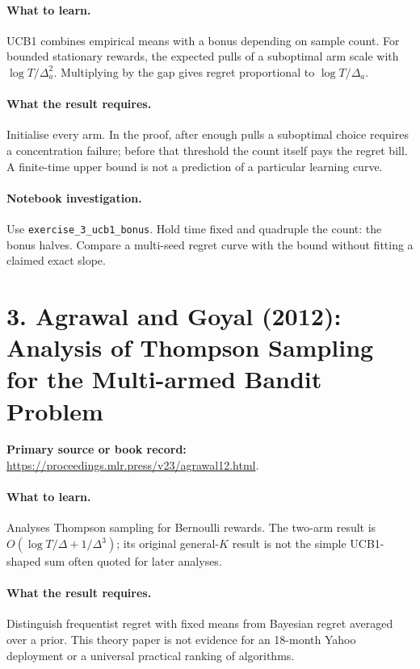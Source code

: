 \documentclass[11pt]{scrartcl}
\begin{document}
\paragraph{What to learn.} UCB1 combines empirical means with a bonus depending on sample count. For bounded stationary rewards, the expected pulls of a suboptimal arm scale with $\log T/\Delta_a^2$. Multiplying by the gap gives regret proportional to $\log T/\Delta_a$.

\paragraph{What the result requires.} Initialise every arm. In the proof, after enough pulls a suboptimal choice requires a concentration failure; before that threshold the count itself pays the regret bill. A finite-time upper bound is not a prediction of a particular learning curve.

\paragraph{Notebook investigation.} Use \texttt{exercise\_3\_ucb1\_bonus}. Hold time fixed and quadruple the count: the bonus halves. Compare a multi-seed regret curve with the bound without fitting a claimed exact slope.

\section*{3. Agrawal and Goyal (2012): Analysis of Thompson Sampling for the Multi-armed Bandit Problem}
\textbf{Primary source or book record:} \url{https://proceedings.mlr.press/v23/agrawal12.html}.

\paragraph{What to learn.} Analyses Thompson sampling for Bernoulli rewards. The two-arm result is $O(\log T/\Delta+1/\Delta^3)$; its original general-$K$ result is not the simple UCB1-shaped sum often quoted for later analyses.

\paragraph{What the result requires.} Distinguish frequentist regret with fixed means from Bayesian regret averaged over a prior. This theory paper is not evidence for an 18-month Yahoo deployment or a universal practical ranking of algorithms.
\end{document}
